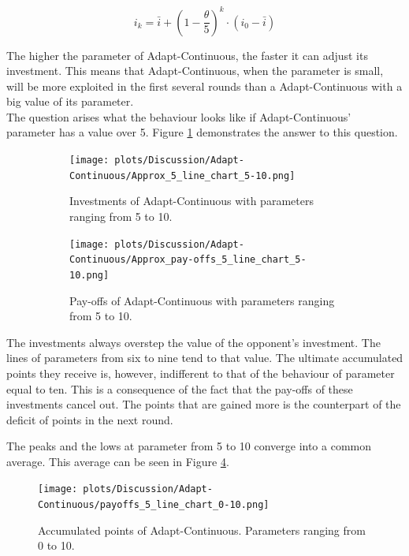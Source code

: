 \documentclass[11pt]{article}
\begin{document}
	\begin{equation}
		i_k = \bar i + (1 - \frac{\theta}{5})^k \cdot (i_0 - \bar i)
		\label{eq:AdpC_i_eq_expl}
	\end{equation}
	
	The higher the parameter of Adapt-Continuous, the faster it can adjust its investment.
	This means that Adapt-Continuous, when the parameter is small, will be more exploited in the first several rounds than a Adapt-Continuous with a big value of its parameter.\\
	
	The question arises what the behaviour looks like if Adapt-Continuous' parameter has a value over 5.
	Figure \ref{fig:AdpC_approx_investm_5-10} demonstrates the answer to this question.\\
	\begin{figure}[h!]
		\centering
		\begin{subfigure}[t]{0.45\textwidth}
			\centering
			\texttt{[image: plots/Discussion/Adapt-Continuous/Approx\_5\_line\_chart\_5-10.png]}
			\caption{Investments of Adapt-Continuous with parameters ranging from 5 to 10.}
			\label{fig:AdpC_approx_investm_5-10}
		\end{subfigure}
		\hfill
		\begin{subfigure}[t]{0.45\textwidth}
			\centering
			\texttt{[image: plots/Discussion/Adapt-Continuous/Approx\_pay-offs\_5\_line\_chart\_5-10.png]}
			\caption{Pay-offs of Adapt-Continuous with parameters ranging from 5 to 10.}
			\label{fig:AdpC_approx_payoff_5-10}
		\end{subfigure}
		\caption{}
		\label{fig:AdpC_approx_invetm_and_payoffs_5-10}
	\end{figure}
	
	The investments always overstep the value of the opponent's investment.
	The lines of parameters from six to nine tend to that value.
	The ultimate accumulated points they receive is, however, indifferent to that of the behaviour of parameter equal to ten.
	This is a consequence of the fact that the pay-offs of these investments cancel out.
	The points that are gained more is the counterpart of the deficit of points in the next round.
	
	The peaks and the lows at parameter from 5 to 10 converge into a common average.
	This average can be seen in Figure \ref{fig:AdpC_avr_points}.\\
	\begin{figure}[h]
		\begin{center}
			\texttt{[image: plots/Discussion/Adapt-Continuous/payoffs\_5\_line\_chart\_0-10.png]}
		\end{center}
		\caption{Accumulated points of Adapt-Continuous. Parameters ranging from 0 to 10.}
		\label{fig:AdpC_avr_points}
	\end{figure}
	
\end{document}
